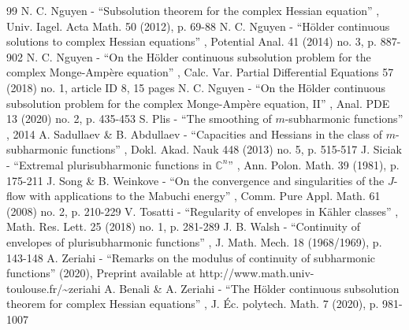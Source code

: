 \documentclass[11pt]{article}
\numberwithin{equation}{section}
\theoremstyle{definition}
\theoremstyle{plain}
\theoremstyle{definition}
\begin{document}
\begin{thebibliography}{99}
 N. C. Nguyen - “Subsolution theorem for the complex Hessian equation” , Univ. Iagel. Acta Math. 50 (2012), p. 69-88
 N. C. Nguyen - “Hölder continuous solutions to complex Hessian equations” , Potential Anal. 41 (2014) no. 3, p. 887-902
 N. C. Nguyen - “On the Hölder continuous subsolution problem for the complex Monge-Ampère equation” , Calc. Var. Partial Differential Equations 57 (2018) no. 1, article ID 8, 15 pages
 N. C. Nguyen - “On the Hölder continuous subsolution problem for the complex Monge-Ampère equation, II” , Anal. PDE 13 (2020) no. 2, p. 435-453
 S. Plis - “The smoothing of $m$-subharmonic functions” , 2014
 A. Sadullaev \& B. Abdullaev - “Capacities and Hessians in the class of $m$-subharmonic functions” , Dokl. Akad. Nauk 448 (2013) no. 5, p. 515-517
 J. Siciak - “Extremal plurisubharmonic functions in $\mathbb{C}^n$” , Ann. Polon. Math. 39 (1981), p. 175-211
 J. Song \& B. Weinkove - “On the convergence and singularities of the $J$-flow with applications to the Mabuchi energy” , Comm. Pure Appl. Math. 61 (2008) no. 2, p. 210-229
 V. Tosatti - “Regularity of envelopes in Kähler classes” , Math. Res. Lett. 25 (2018) no. 1, p. 281-289
 J. B. Walsh - “Continuity of envelopes of plurisubharmonic functions” , J. Math. Mech. 18 (1968/1969), p. 143-148
 A. Zeriahi - “Remarks on the modulus of continuity of subharmonic functions” (2020), Preprint available at http://www.math.univ-toulouse.fr/\textasciitilde{}zeriahi
 A. Benali \& A. Zeriahi - “The Hölder continuous subsolution theorem for complex Hessian equations” , J. Éc. polytech. Math. 7 (2020), p. 981-1007
\end{thebibliography}
\end{document}

